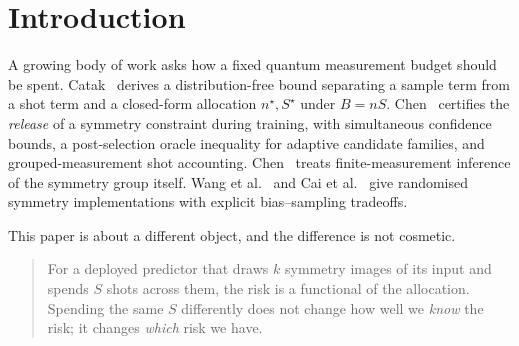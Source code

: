 \documentclass{article}
\begin{document}
\begin{abstract}
Two earlier headline claims are withdrawn. The claim that the group-free arm is cheaper on six of seven
tasks rested on an arm definition that scored the group arm's raw baseline with half its shots and on a
frontier whose grid started where both arms already crossed; with a common-estimand record and a fixed
total budget the comparison is \emph{mixed}, with the group arm ahead on one physical task and the
group-free arm ahead on another. The claim that a valid certificate is needed to select safely is also
not supported: generic plug-in selection matches or beats the certified rule everywhere we looked, and
the distribution-free rules never fire at these gaps.

We also report what a correct simultaneous distribution-free certificate costs here --- five to twenty
thousand labelled preparations for gaps of order $10^{-3}$, a cost of that particular conservative bound
and not a lower bound for the problem --- and, on a bond-alternating Heisenberg response with a
control-line rectification error, that the sign of orbit averaging's benefit is governed by how much odd
signal the target contains rather than by whether a symmetry exists. Every number in this paper is
emitted from the result files by scripts that also generate the sentences quoting them.
\end{abstract}

\section{Introduction}

A growing body of work asks how a fixed quantum measurement budget should be spent.
Catak~\citep{catak2026budget} derives a distribution-free bound separating a sample term from a shot
term and a closed-form allocation $n^\star, S^\star$ under $B=nS$. Chen~\citep{chen2026release}
certifies the \emph{release} of a symmetry constraint during training, with simultaneous confidence
bounds, a post-selection oracle inequality for adaptive candidate families, and grouped-measurement
shot accounting. Chen~\citep{chen2026symmetry} treats finite-measurement inference of the symmetry
group itself. Wang et al.~\citep{wang2026fourier} and Cai et al.~\citep{cai2021random} give
randomised symmetry implementations with explicit bias--sampling tradeoffs.

This paper is about a different object, and the difference is not cosmetic.

\begin{quote}
For a deployed predictor that draws $k$ symmetry images of its input and spends $S$ shots across
them, the risk is a functional of the allocation. Spending the same $S$ differently does not change
how well we \emph{know} the risk; it changes \emph{which} risk we have.
\end{quote}
\end{document}
